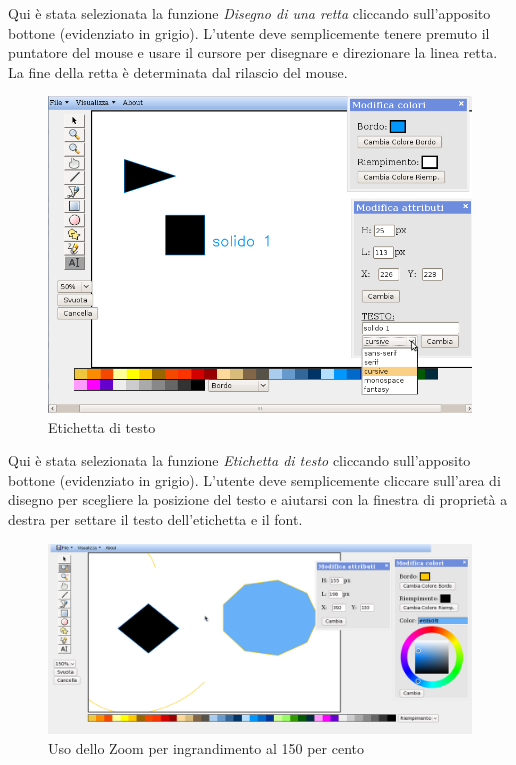 \vspace{300pt}
Qui \`e stata selezionata la funzione \textit{Disegno di una retta} cliccando sull'apposito bottone (evidenziato in grigio). L'utente deve semplicemente tenere premuto il puntatore del mouse e usare il cursore per disegnare e direzionare la linea retta. La fine della retta \`e determinata dal rilascio del mouse. \\

\begin{figure}[!ht]
\centering
\includegraphics[scale=0.4]{images/label.png}
\caption{Etichetta di testo}
\end{figure} 

\vspace{300pt}
Qui \`e stata selezionata la funzione \textit{Etichetta di testo} cliccando sull'apposito bottone (evidenziato in grigio). L'utente deve semplicemente cliccare sull'area di disegno per scegliere la posizione del testo e aiutarsi con la finestra di propriet\`a a destra per settare il testo dell'etichetta e il font. \\
 
\begin{figure}[!ht]
\centering
\includegraphics[scale=0.4]{images/zoom_piu.png}
\caption{Uso dello Zoom per ingrandimento al 150 per cento}
\end{figure} 

